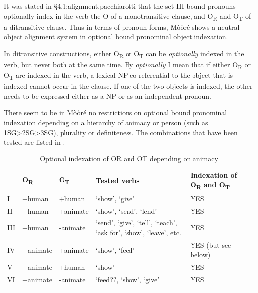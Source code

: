 \documentclass[output=paper]{langsci/langscibook}
\begin{document}
\z

It was stated in {§4.1:alignment.pacchiarotti} that the set III bound pronouns optionally index in the verb the O of a monotransitive clause, and O\textsubscript{R} and O\textsubscript{T} of a ditransitive clause. Thus in terms of pronoun forms, Mòòré shows a neutral object alignment system in optional bound pronominal object indexation.  

In ditransitive constructions, either O\textsubscript{R} or O\textsubscript{T} can be \textit{optionally} indexed in the verb, but never both at the same time. By \textit{optionally} I mean that if either O\textsubscript{R} or O\textsubscript{T} are indexed in the verb, a lexical NP co-referential to the object that is indexed cannot occur in the clause. If one of the two objects is indexed, the other needs to be expressed either as a NP or as an independent pronoun. 

There seem to be in Mòòré no restrictions on optional bound pronominal indexation depending on a hierarchy of animacy or person (such as 1SG{\textgreater}2SG{\textgreater}3SG), plurality or definiteness. The combinations that have been tested are listed in .

\begin{table}
\begin{tabular}{lllll} & \textbf{O}\textbf{\textsubscript{R}} & \textbf{O}\textbf{\textsubscript{T}} & \textbf{Tested verbs} & \textbf{Indexation of O}\textbf{\textsubscript{R}}\textbf{ and O}\textbf{\textsubscript{T}}\textbf{ }\\
\lsptoprule
I & +human & +human & `show', `give' & YES\\
II & +human & +animate & `show', `send', `lend' & YES\\
III & +human & -animate & `send', `give', `tell', `teach', `ask for', `show', `leave', etc. & YES\\
IV & +animate & +animate & `show', `feed' & YES (but see below)\\
V & +animate & +human & `show' & YES\\
VI & +animate & -animate & `feed??, `show', `give' & YES\\
\lspbottomrule
\end{tabular}
\caption{Optional indexation of OR and OT depending on animacy}
\label{tab:3.pacchiarotti}

 \end{table}
\end{document}

